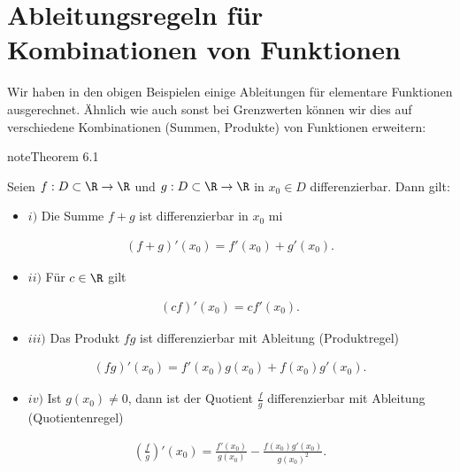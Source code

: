 \documentclass[letterpaper,10pt,english]{jupyterBook}
\begin{document}
\section{Ableitungsregeln für Kombinationen von Funktionen}
\label{\detokenize{differential/kombfkt:ableitungsregeln-fur-kombinationen-von-funktionen}}\label{\detokenize{differential/kombfkt::doc}}
Wir haben in den obigen Beispielen einige Ableitungen für elementare Funktionen ausgerechnet. Ähnlich wie auch sonst bei Grenzwerten können wir dies auf verschiedene Kombinationen (Summen, Produkte) von Funktionen erweitern:
\label{differential/kombfkt:theorem-0}
\begin{sphinxadmonition}{note}{Theorem 6.1}



Seien \(f: D\subset \R \rightarrow \R\) und \(g: D\subset \R \rightarrow \R\) in \(x_0 \in D\) differenzierbar. Dann gilt:
\begin{itemize}
\item {} 
\(i)\) Die Summe \(f+g\) ist differenzierbar in \(x_0\) mi

\end{itemize}
\begin{equation*}
\begin{split} (f+g)'(x_0) = f'(x_0) + g'(x_0).\end{split}
\end{equation*}\begin{itemize}
\item {} 
\(ii)\) Für \(c \in \R\) gilt

\end{itemize}
\begin{equation*}
\begin{split} (cf)'(x_0) = c f'(x_0).\end{split}
\end{equation*}\begin{itemize}
\item {} 
\(iii)\) Das Produkt \(fg\) ist differenzierbar mit Ableitung (Produktregel)

\end{itemize}
\begin{equation*}
\begin{split} (fg)'(x_0) = f'(x_0) g(x_0) +  f(x_0) g'(x_0).\end{split}
\end{equation*}\begin{itemize}
\item {} 
\(iv)\) Ist \(g(x_0) \neq 0\), dann ist der Quotient \(\frac{f}g\) differenzierbar mit Ableitung (Quotientenregel)

\end{itemize}
\begin{equation*}
\begin{split} (\frac{f}g)'(x_0) = \frac{f'(x_0)}{ g(x_0)} -  \frac{f(x_0) g'(x_0)}{g(x_0)^2}.\end{split}
\end{equation*}\end{sphinxadmonition}
\end{document}
